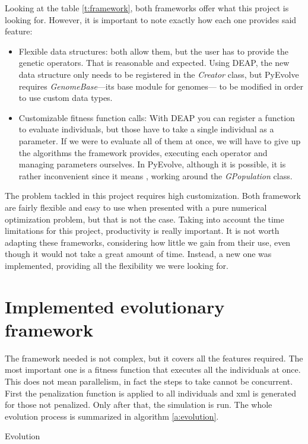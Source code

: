 Looking at the table \ref{t:framework}, both frameworks offer what this project is looking for. However, it is important to note exactly how each one provides said feature:

\begin{itemize}
	\item Flexible data structures: both allow them, but the user has to provide the genetic operators. That is reasonable and expected. Using DEAP, the new data structure only needs to be registered in the \textit{Creator} class, but PyEvolve requires \textit{GenomeBase}---its base module for genomes--- to be modified in order to use custom data types.
	\item Customizable fitness function calls: With DEAP you can register a function to evaluate individuals, but those have to take a single individual as a parameter. If we were to evaluate all of them at once, we will have to give up the algorithms the framework provides, executing each operator and managing parameters ourselves. In PyEvolve, although it is possible, it is rather inconvenient since it means , working around the \textit{GPopulation} class.
\end{itemize} 

The problem tackled in this project requires high customization. Both framework are fairly flexible and easy to use when presented with a pure numerical optimization problem, but that is not the case. Taking into account the time limitations for this project, productivity is really important. It is not worth adapting these frameworks, considering how little we gain from their use, even though it would not take a great amount of time. Instead, a new one was implemented, providing all the flexibility we were looking for.

\section{Implemented evolutionary framework}

The framework needed is not complex, but it covers all the features required. The most important one is a fitness function that executes all the individuals at once. This does not mean parallelism, in fact the steps to take cannot be concurrent. First the penalization function is applied to all individuals and xml is generated for those not penalized. Only after that, the simulation is run. The whole evolution process is summarized in algorithm \ref{a:evolution}.
 
\begin{algorithm}
	\caption{Evolution}
	\label{a:evolution}
\end{algorithm}

